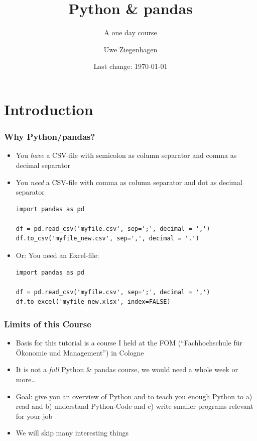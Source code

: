 \documentclass[english]{beamer}
\author{Uwe Ziegenhagen}
\title{Python \& pandas}
\subtitle{A one day course}
\institute{\url{github.com/UweZiegenhagen/OneDayPythonPandasCourse}}
\date{Last change: \today}
\begin{document}
\begin{frame}

\maketitle

\end{frame}

\section{Introduction}

\begin{frame}[fragile]
\frametitle{Why Python/pandas?}

\begin{itemize}
	\item You \textit{have} a CSV-file with semicolon as column separator and comma as decimal separator
	\item You \textit{need} a CSV-file with comma as column separator and dot as decimal separator


\begin{lstlisting}
import pandas as pd

df = pd.read_csv('myfile.csv', sep=';', decimal = ',')
df.to_csv('myfile_new.csv', sep=',', decimal = '.')
\end{lstlisting}

	\item Or: You need an Excel-file:


\begin{lstlisting}
import pandas as pd

df = pd.read_csv('myfile.csv', sep=';', decimal = ',')
df.to_excel('myfile_new.xlsx', index=FALSE)
\end{lstlisting}

\end{itemize}

\end{frame}

\begin{frame}
\frametitle{Limits of this Course}

\begin{itemize}
\item Basis for this tutorial is a course I held at the FOM (\enquote{Fachhochschule für Ökonomie und Management}) in Cologne 
\item It is not a \textit{full} Python \& pandas course, we would need a whole week or more\ldots
\item Goal: give you an overview of Python and to teach you enough Python to a) read and b) understand Python-Code and c) write smaller programs relevant for your job 
\item We will skip many interesting things 
\end{itemize}
\end{frame}
\end{document}
